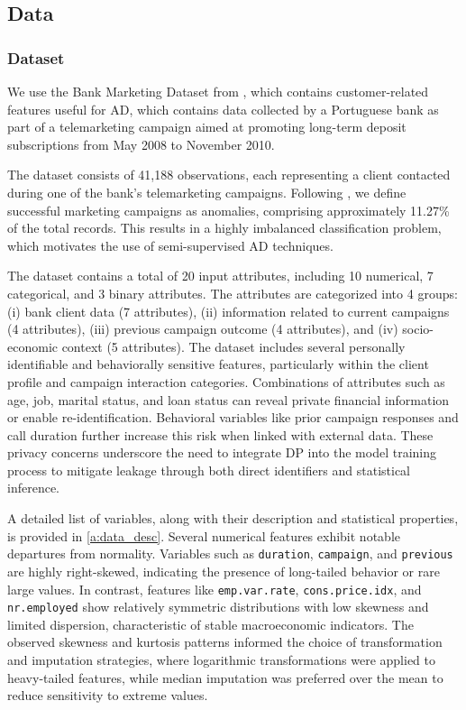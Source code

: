 \subsection{Data}

\subsubsection{Dataset}

We use the Bank Marketing Dataset from \cite{moro2014bank}, which contains customer-related features useful for AD, which contains data collected by a Portuguese bank as part of a telemarketing campaign aimed at promoting long-term deposit subscriptions from May 2008 to November 2010. 

The dataset consists of 41,188 observations, each representing a client contacted during one of the bank’s telemarketing campaigns. Following \cite{pang2019deep}, we define successful marketing campaigns as anomalies, comprising approximately 11.27\% of the total records. This results in a highly imbalanced classification problem, which motivates the use of semi-supervised AD techniques.

The dataset contains a total of 20 input attributes, including 10 numerical, 7 categorical, and 3 binary attributes. The attributes are categorized into 4 groups: (i) bank client data (7 attributes), (ii) information related to current campaigns (4 attributes), (iii) previous campaign outcome (4 attributes), and (iv) socio-economic context (5 attributes). The dataset includes several personally identifiable and behaviorally sensitive features, particularly within the client profile and campaign interaction categories. Combinations of attributes such as age, job, marital status, and loan status can reveal private financial information or enable re-identification. Behavioral variables like prior campaign responses and call duration further increase this risk when linked with external data. These privacy concerns underscore the need to integrate DP into the model training process to mitigate leakage through both direct identifiers and statistical inference.

A detailed list of variables, along with their description and statistical properties, is provided in \ref{a:data_desc}. Several numerical features exhibit notable departures from normality. Variables such as \texttt{duration}, \texttt{campaign}, and \texttt{previous} are highly right-skewed, indicating the presence of long-tailed behavior or rare large values. In contrast, features like \texttt{emp.var.rate}, \texttt{cons.price.idx}, and \texttt{nr.employed} show relatively symmetric distributions with low skewness and limited dispersion, characteristic of stable macroeconomic indicators. The observed skewness and kurtosis patterns informed the choice of transformation and imputation strategies, where logarithmic transformations were applied to heavy-tailed features, while median imputation was preferred over the mean to reduce sensitivity to extreme values.

